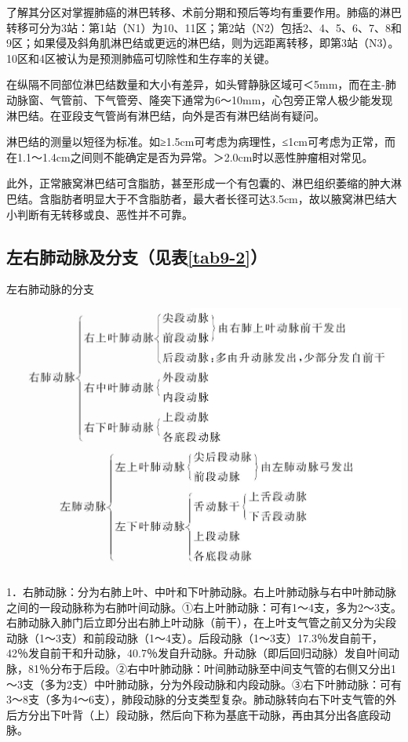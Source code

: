了解其分区对掌握肺癌的淋巴转移、术前分期和预后等均有重要作用。肺癌的淋巴转移可分为3站：第1站（N1）为10、11区；第2站（N2）包括2、4、5、6、7、8和9区；如果侵及斜角肌淋巴结或更远的淋巴结，则为远距离转移，即第3站（N3）。10区和4区被认为是预测肺癌可切除性和生存率的关键。

在纵隔不同部位淋巴结数量和大小有差异，如头臂静脉区域可＜5mm，而在主-肺动脉窗、气管前、下气管旁、隆突下通常为6～10mm，心包旁正常人极少能发现淋巴结。在亚段支气管尚有淋巴结，向外是否有淋巴结尚有疑问。

淋巴结的测量以短径为标准。如≥1.5cm可考虑为病理性，≤1cm可考虑为正常，而在1.1～1.4cm之间则不能确定是否为异常。＞2.0cm时以恶性肿瘤相对常见。

此外，正常腋窝淋巴结可含脂肪，甚至形成一个有包囊的、淋巴组织萎缩的肿大淋巴结。含脂肪者明显大于不含脂肪者，最大者长径可达3.5cm，故以腋窝淋巴结大小判断有无转移或良、恶性并不可靠。

\subsection{左右肺动脉及分支（见表\ref{tab9-2}）}

\begin{table}[htbp]
\centering
\caption{左右肺动脉的分支}
\label{tab9-2}
\includegraphics[width=\textwidth,height=\textheight,keepaspectratio]{./images/Image00183.jpg}
\end{table}

1．右肺动脉：分为右肺上叶、中叶和下叶肺动脉。右上叶肺动脉与右中叶肺动脉之间的一段动脉称为右肺叶间动脉。①右上叶肺动脉：可有1～4支，多为2～3支。右肺动脉入肺门后立即分出右肺上叶动脉（前干），在上叶支气管之前又分为尖段动脉（1～3支）和前段动脉（1～4支）。后段动脉（1～3支）17.3％发自前干，42％发自前干和升动脉，40.7％发自升动脉。升动脉（即后回归动脉）发自叶间动脉，81％分布于后段。②右中叶肺动脉：叶间肺动脉至中间支气管的右侧又分出1～3支（多为2支）中叶肺动脉，分为外段动脉和内段动脉。③右下叶肺动脉：可有3～8支（多为4～6支），肺段动脉的分支类型复杂。肺动脉转向右下叶支气管的外后方分出下叶背（上）段动脉，然后向下称为基底干动脉，再由其分出各底段动脉。

